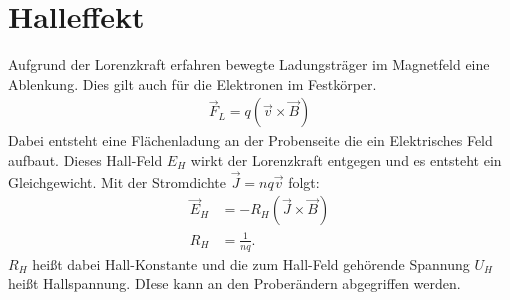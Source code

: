 \section{Halleffekt}

Aufgrund der Lorenzkraft erfahren bewegte Ladungsträger im Magnetfeld eine Ablenkung. Dies gilt auch für die Elektronen im Festkörper.
\begin{align}
    \Vec{F}_L = q(\Vec{v} \times \Vec{B})
\end{align}
Dabei entsteht eine Flächenladung an der Probenseite die ein Elektrisches Feld aufbaut. Dieses Hall-Feld $E_H$ wirkt der Lorenzkraft entgegen und es entsteht ein Gleichgewicht. Mit der Stromdichte $ \Vec{J} = nq\Vec{v}$ folgt:
\begin{align}
    \Vec{E}_H &= -R_H ( \Vec{J} \times \Vec{B} ) \\
    R_H &= \frac{1}{nq}.
\end{align}
$R_H$ heißt dabei Hall-Konstante und die zum Hall-Feld gehörende Spannung $U_H$ heißt Hallspannung. DIese kann an den Proberändern abgegriffen werden.\\

